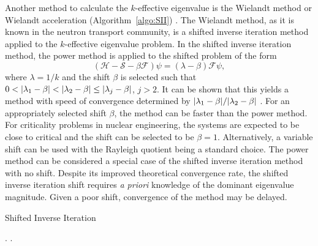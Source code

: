 Another method to calculate the $k$-effective eigenvalue is the Wielandt method or Wielandt acceleration (Algorithm~\ref{algo:SII}) \cite{yamamoto_reliable_2004}. The Wielandt method, as it is known in the neutron transport community, is a shifted inverse iteration method \cite{ipsen_computing_1997} applied to the $k$-effective eigenvalue problem. In the shifted inverse iteration method, the power method is applied to the shifted problem of the form
\begin{equation}
(\mathcal{H} - \mathcal{S} - \beta \mathcal{F})\psi = (\lambda - \beta) \mathcal{F} \psi,
\end{equation}
where $\lambda = 1/k$ and the shift $\beta$ is selected such that $0 < \lvert\lambda_{1} - \beta\rvert < \lvert\lambda_{2} - \beta\rvert \leq \lvert\lambda_{j} - \beta\rvert$, $j > 2$. It can be shown that this yields a method with speed of convergence determined by $\lvert\lambda_{1} - \beta\rvert/\lvert\lambda_{2} - \beta\rvert$ \cite{ipsen_computing_1997}. For an appropriately selected shift $\beta$, the method can be faster than the power method. For criticality problems in nuclear engineering, the systems are expected to be close to critical and the shift can be selected to be $\beta = 1$. Alternatively, a variable shift can be used with the Rayleigh quotient being a standard choice. The power method can be considered a special case of the shifted inverse iteration method with no shift. Despite its improved theoretical convergence rate, the shifted inverse iteration shift requires \textit{a priori} knowledge of the dominant eigenvalue magnitude. Given a poor shift, convergence of the method may be delayed.

\begin{algorithm}[H]
				\caption{Shifted Inverse Iteration \cite{ipsen_computing_1997}}
				\begin{algorithmic}[1]
						.
						.
					\ENDFOR
				\end{algorithmic}
				\label{algo:SII}
\end{algorithm}





